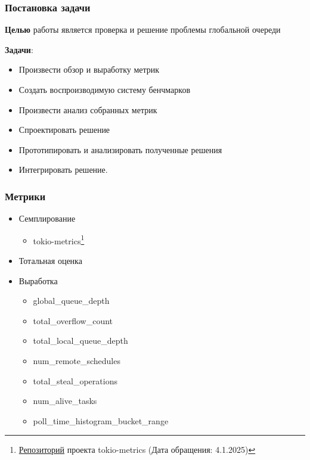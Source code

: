 \documentclass{beamer}
\begin{document}
\begin{frame}
  \frametitle{Постановка задачи}
  \textbf{Целью} работы является проверка и решение проблемы глобальной очереди

  \textbf{Задачи}:
  \begin{itemize}
    \item Произвести обзор и выработку метрик
    \item Создать воспроизводимую систему бенчмарков
    \item Произвести анализ собранных метрик
    \item Спроектировать решение
    \item Прототипировать и анализировать полученные решения
    \item Интегрировать решение.
  \end{itemize}
\end{frame}

\begin{frame}
\frametitle{Метрики}
  \begin{itemize}
    \item Семплирование
    \begin{itemize}
      \item tokio-metrics\footnote{\href{https://github.com/tokio-rs/tokio-metrics}{Репозиторий} проекта tokio-metrics (Дата обращения: 4.1.2025)}
    \end{itemize}
    \item Тотальная оценка
    \item Выработка
    \begin{itemize}
      \item global\_queue\_depth
      \item total\_overflow\_count
      \item total\_local\_queue\_depth
      \item num\_remote\_schedules
      \item total\_steal\_operations
      \item num\_alive\_tasks
      \item poll\_time\_histogram\_bucket\_range
    \end{itemize}
  \end{itemize}
\end{frame}
\end{document}
